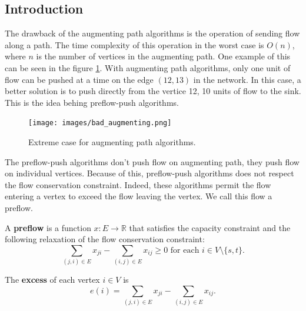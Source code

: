 \subsection{Introduction}

The drawback of the augmenting path algorithms is the operation of sending flow along a path. The time complexity of this operation in the worst case is $O(n)$, where $n$ is the number of vertices in the augmenting path. One example of this  can be seen in the figure \ref{img:bad_augmenting}. With augmenting path algorithms, only one unit of flow can be pushed at a time on the edge $(12, 13)$ in the network. In this case, a better solution is to push directly from the vertice 12, 10 units of flow to the sink. This is the idea behing preflow-push algorithms.

\begin{figure}[H]
\centering
\texttt{[image: images/bad\_augmenting.png]}
\caption{Extreme case for augmenting path algorithms.}
\label{img:bad_augmenting}
\end{figure}

The preflow-push algorithms don't push flow on augmenting path, they push flow on individual vertices. Because of this, preflow-push algorithms does not respect the flow conservation constraint. Indeed, these algorithms permit the flow entering a vertex to exceed the flow leaving the vertex. We call this flow a preflow.

\begin{definition}
\label{preflow}
A \textbf{preflow} is a function $x: E \to \mathbb{R}$ that satisfies the capacity constraint and the following relaxation of the flow conservation constraint:
$$\sum\limits_{(j,i) \in E} x_{ji} - \sum\limits_{(i,j) \in E} x_{ij} \geq 0 \text{	for each } i \in V \setminus \{s, t\}.$$
\end{definition}

\begin{definition}
\label{excess}
The \textbf{excess} of each vertex $i \in V$ is 
$$e(i) = \sum\limits_{(j,i) \in E} x_{ji} - \sum\limits_{(i,j) \in E} x_{ij}.$$
\end{definition}

